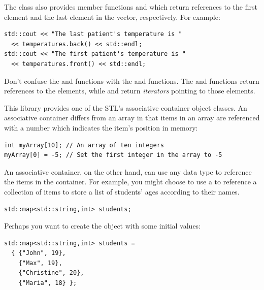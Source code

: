 The  class also provides member functions  and  which return references to the first element and the last element in the vector, respectively.
For example:

\noindent\begin{minipage}{\linewidth}\begin{lstlisting}
std::cout << "The last patient's temperature is " 
  << temperatures.back() << std::endl;
std::cout << "The first patient's temperature is " 
  << temperatures.front() << std::endl;
\end{lstlisting}\end{minipage}

Don't confuse the  and  functions with the  and  functions. 
The  and  functions return references to the elements, while  and  return \emph{iterators} pointing to those elements.


This library provides one of the STL's associative container object classes. 
An associative container differs from an array in that items in an array are referenced with a number which indicates the item's position in memory:

\noindent\begin{minipage}{\linewidth}\begin{lstlisting}
int myArray[10]; // An array of ten integers
myArray[0] = -5; // Set the first integer in the array to -5
\end{lstlisting}\end{minipage}

An associative container, on the other hand, can use any data type to reference the items in the container. 
For example, you might choose to use a  to reference a collection of  items to store a list of students' ages according to their names.

\noindent\begin{minipage}{\linewidth}\begin{lstlisting}
std::map<std::string,int> students;
\end{lstlisting}\end{minipage}

Perhaps you want to create the object with some initial values: \nopagebreak[4]

\noindent\begin{minipage}{\linewidth}\begin{lstlisting}
std::map<std::string,int> students = 
  { {"John", 19}, 
    {"Max", 19}, 
    {"Christine", 20}, 
    {"Maria", 18} };
\end{lstlisting}\end{minipage}


